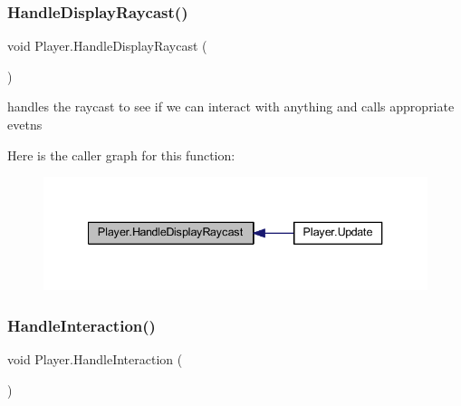 \mbox{\label{class_player_a5f5cd09ca02aa4a73fb2df2828671596}} 
\subsubsection{\texorpdfstring{Handle\+Display\+Raycast()}{HandleDisplayRaycast()}}
{\footnotesize\ttfamily void Player.\+Handle\+Display\+Raycast (\begin{DoxyParamCaption}{ }\end{DoxyParamCaption})\hspace{0.3cm}{\ttfamily [private]}}



handles the raycast to see if we can interact with anything and calls appropriate evetns 

Here is the caller graph for this function\+:\nopagebreak
\begin{figure}[H]
\begin{center}
\leavevmode
\includegraphics[width=340pt]{class_player_a5f5cd09ca02aa4a73fb2df2828671596_icgraph}
\end{center}
\end{figure}
\mbox{\label{class_player_a377a703ca99ceaf80d62874b2585c745}} 
\subsubsection{\texorpdfstring{Handle\+Interaction()}{HandleInteraction()}}
{\footnotesize\ttfamily void Player.\+Handle\+Interaction (\begin{DoxyParamCaption}{ }\end{DoxyParamCaption})\hspace{0.3cm}{\ttfamily [private]}}



